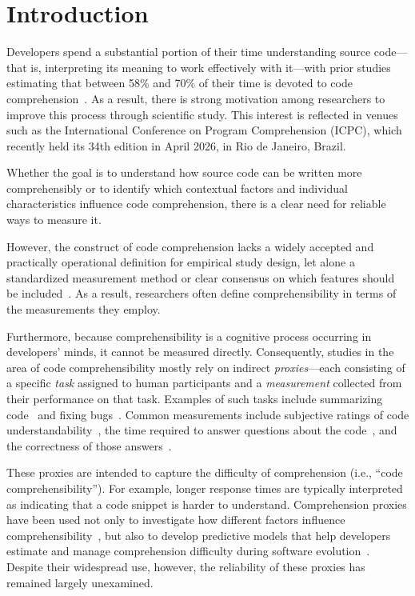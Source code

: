 \section{Introduction}
\label{sec:introMain}

Developers spend a substantial portion of their time understanding source code---that is, interpreting its meaning to work effectively with it---with
prior studies estimating that between 58\% and 70\% of their time is devoted to code comprehension~\cite{percent1,scalabrino2017automatically}. As a result, there is strong motivation among researchers to improve this process through scientific study. This interest is reflected in venues such as the International Conference on Program Comprehension (ICPC), which recently held its 34th edition in April 2026, in Rio de Janeiro, Brazil.

Whether the goal is to understand how source code can be written more comprehensibly or to identify which contextual factors and individual characteristics influence code comprehension, there is a clear need for reliable ways to measure it.

However, the construct of code comprehension lacks a widely accepted and practically operational definition for empirical study design, let alone a standardized measurement method or clear consensus on which features should be included~\cite{Wyrich:ACS23}. As a result, researchers often define comprehensibility in terms of the measurements they employ.

Furthermore, because comprehensibility is a cognitive process occurring in developers' minds, it cannot be measured directly. Consequently, studies in the area of code comprehensibility mostly rely on indirect \textit{proxies}---each consisting of a specific \textit{task} assigned to human participants and a \textit{measurement} collected from their performance on that task. Examples of such tasks include summarizing code~\cite{S4, S11, S24, S35, 33-7, 33-8, S38, S42, S49} and fixing bugs~\cite{S38, S55, S64, S87}. Common measurements include subjective ratings of code understandability~\cite{S4, S34, 33-7, S42, S49, 33-20}, the time required to answer questions about the code~\cite{Scalabrino:TSE19, S11, S39, S48, S50, S57, S59, S60, 33-24}, and the correctness of those answers~\cite{Scalabrino:TSE19, S11, NovicesVSprof1:BIBE2016, S48, S50, S57, S59, S60, 33-24}.

These proxies are intended to capture the difficulty of comprehension (i.e., ``code comprehensibility''). For example, longer response times are typically interpreted as indicating that a code snippet is harder to understand. Comprehension proxies have been used not only to investigate how different factors influence comprehensibility~\cite{S4,S49,Peitek:TSE18,Siegmund:ICSE14,Stapleton:ICPC2020,Wyrich:ACS23}, but also to develop predictive models that help developers estimate and manage comprehension difficulty during software evolution~\cite{Scalabrino:TSE19,Raymond:TSE10,Lavazza:ESE2023, De:2025}. Despite their widespread use, however, the reliability of these proxies has remained largely unexamined.

